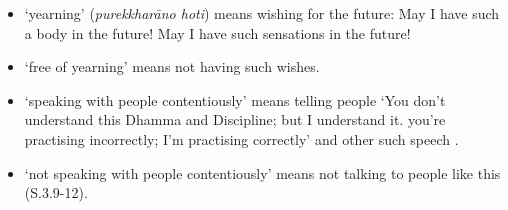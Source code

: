\begin{itemize}
\item `yearning' (\textit{purekkharāno hoti}) means wishing for the future: May I have such a body in the future! May I have such sensations in the future!

\item `free of yearning' means not having such wishes.

\item `speaking with people contentiously' means telling people `You don't understand this Dhamma and Discipline; but I understand it. you're practising incorrectly; I'm practising correctly' and other such speech .

\item `not speaking with people contentiously' means not talking to people like this (S.3.9-12).

\end{itemize}
